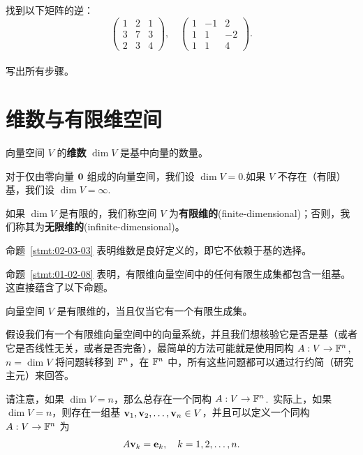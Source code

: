 \begin{problemset}
\item \label{ex:02-04-01} 找到以下矩阵的逆：
$$\begin{pmatrix} 1 & 2 & 1 \\ 3 & 7 & 3 \\ 2 & 3 & 4 \end{pmatrix},\quad \begin{pmatrix} 1 & -1 & 2 \\ 1 & 1 & -2 \\ 1 & 1 & 4 \end{pmatrix}.$$
\\
写出所有步骤。

\end{problemset}

\section{维数与有限维空间}\label{sec:02-05}

\begin{definition*}
向量空间 $V$ 的\textbf{维数} $\dim V$ 是基中向量的数量。
\end{definition*}

对于仅由零向量 $\mathbf{0}$ 组成的向量空间，我们设 $\dim V = 0$.如果 $V$ 不存在（有限）基，我们设 $\dim V = \infty$.

如果 $\dim V$ 是有限的，我们称空间 $V$ 为\textbf{有限维的}(finite-dimensional)；否则，我们称其为\textbf{无限维的}(infinite-dimensional)。

命题~\ref{stmt:02-03-03} 表明维数是良好定义的，即它不依赖于基的选择。

命题~\ref{stmt:01-02-08} 表明，有限维向量空间中的任何有限生成集都包含一组基。这直接蕴含了以下命题。

\begin{proposition}\label{stmt:02-05-01}
向量空间 $V$ 是有限维的，当且仅当它有一个有限生成集。
\end{proposition}

假设我们有一个有限维向量空间中的向量系统，并且我们想核验它是否是基（或者它是否线性无关，或者是否完备），最简单的方法可能就是使用同构 $A: V \to \mathbb{F}^n$, $n = \dim V$ 将问题转移到 $\mathbb{F}^n$，在 $\mathbb{F}^n$ 中，所有这些问题都可以通过行约简（研究主元）来回答。

请注意，如果 $\dim V = n$，那么总存在一个同构 $A: V \to \mathbb{F}^n$.~实际上，如果 $\dim V = n$，则存在一组基 $\mathbf{v}_1, \mathbf{v}_2, \dots, \mathbf{v}_n \in V$，并且可以定义一个同构 $A: V \to \mathbb{F}^n$ 为 $$A \mathbf{v}_k = \mathbf{e}_k, \quad k = 1, 2, \dots, n.$$


